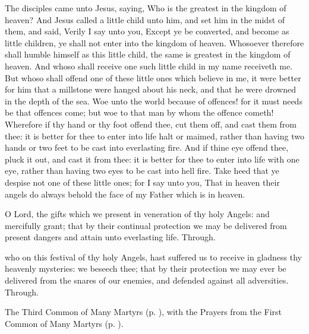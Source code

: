  The disciples came unto Jesus, saying, Who is the greatest in the kingdom of heaven? And Jesus called a little child unto him, and set him in the midst of them, and said, Verily I say unto you, Except ye be converted, and become as little children, ye shall not enter into the kingdom of heaven. Whosoever therefore shall humble himself as this little child, the same is greatest in the kingdom of heaven. And whoso shall receive one such little child in my name receiveth me. But whoso shall offend one of these little ones which believe in me, it were better for him that a millstone were hanged about his neck, and that he were drowned in the depth of the sea. Woe unto the world because of offences! for it must needs be that offences come; but woe to that man by whom the offence cometh! Wherefore if thy hand or thy foot offend thee, cut them off, and cast them from thee: it is better for thee to enter into life halt or maimed, rather than having two hands or two feet to be cast into everlasting fire. And if thine eye offend thee, pluck it out, and cast it from thee: it is better for thee to enter into life with one eye, rather than having two eyes to be cast into hell fire. Take heed that ye despise not one of these little ones; for I say unto you, That in heaven their angels do always behold the face of my Father which is in heaven.


\secret
{} O Lord, the gifts which we present in veneration of thy holy Angels: and mercifully grant; that by their continual protection we may be delivered from present dangers and attain unto everlasting life. Through.


\postcommunion
{} who on this festival of thy holy Angels, hast suffered us to receive in gladness thy heavenly mysteries: we beseech thee; that by their protection we may ever be delivered from the snares of our enemies, and defended against all adversities. Through.



\begin{rubric}
	The Third Common of Many Martyrs (p. \pageref{CommonMartyrsIII}), with the Prayers from the First Common of Many Martyrs (p. \pageref{CommonMartyrsI}).
\end{rubric}


